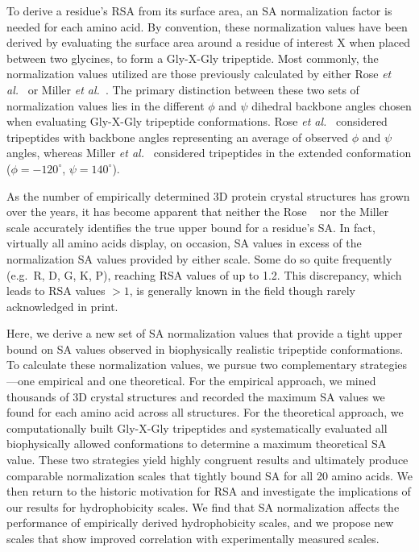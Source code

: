 \documentclass[11pt]{article}
\begin{document}
To derive a residue's RSA from its surface area, an SA normalization factor is needed for each amino acid. By convention, these normalization values have been derived by evaluating the surface area around a residue of interest X when placed between two glycines, to form a Gly-X-Gly tripeptide. Most commonly, the normalization values utilized are those previously calculated by either Rose \emph{et al.}~\cite{Rose1985} or Miller \emph{et al.}~\cite{Miller1987}. The primary distinction between these two sets of normalization values lies in the different $\phi$ and $\psi$ dihedral backbone angles chosen when evaluating Gly-X-Gly tripeptide conformations. Rose \emph{et al.}~\cite{Rose1985} considered tripeptides with backbone angles representing an average of observed $\phi$ and $\psi$ angles, whereas Miller \emph{et al.}~\cite{Miller1987} considered tripeptides in the extended conformation ($\phi= -120^\circ$, $\psi=140^\circ$).

As the number of empirically determined 3D protein crystal structures has grown over the years, it has become apparent that neither the Rose ~\cite{Rose1985} nor the Miller ~\cite{Miller1987} scale accurately identifies the true upper bound for a residue's SA. In fact, virtually all amino acids display, on occasion, SA values in excess of the normalization SA values provided by either scale. Some do so quite frequently (e.g.\ R, D, G, K, P), reaching RSA values of up to 1.2. This discrepancy, which leads to RSA values $>1$, is generally known in the field though rarely acknowledged in print.

Here, we derive a new set of SA normalization values that provide a tight upper bound on SA values observed in biophysically realistic tripeptide conformations. To calculate these normalization values, we pursue two complementary strategies---one empirical and one theoretical. For the empirical approach, we mined thousands of 3D crystal structures and recorded the maximum SA values we found for each amino acid across all structures. For the theoretical approach, we computationally built Gly-X-Gly tripeptides and systematically evaluated all biophysically allowed conformations to determine a maximum theoretical SA value. These two strategies yield highly congruent results and ultimately produce comparable normalization scales that tightly bound SA for all 20 amino acids. We then return to the historic motivation for RSA and investigate the implications of our results for hydrophobicity scales. We find that SA normalization affects the performance of empirically derived hydrophobicity scales, and we propose new scales that show improved correlation with experimentally measured scales.
\end{document}

